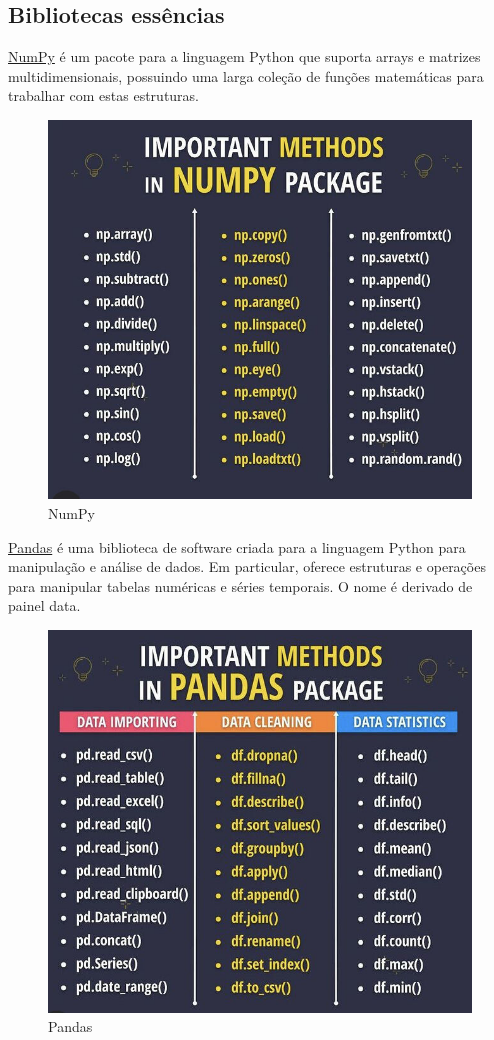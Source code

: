 \subsection{Bibliotecas essências}

\underline{NumPy} é um pacote para a linguagem Python que suporta arrays e matrizes multidimensionais, possuindo uma larga coleção de funções matemáticas para trabalhar com estas estruturas.

\begin{figure}[!htp]
    \centering
    \includegraphics[scale=.8]{../img/python/numpy.jpeg}
    \caption{NumPy}
    \label{img:numpy}
\end{figure}


\underline{Pandas} é uma biblioteca de software criada para a linguagem Python para manipulação e análise de dados. 
Em particular, oferece estruturas e operações para manipular tabelas numéricas e séries temporais. 
O nome é derivado de painel data.

\begin{figure}[!htp]
    \centering
    \includegraphics[scale=.8]{../img/python/pandas.jpeg}
    \caption{Pandas}
    \label{img:pandas}
\end{figure}

